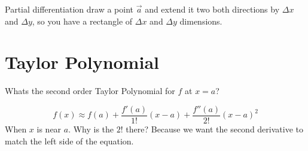 \documentclass[letter]{article}
\begin{document}
Partial differentiation draw a point $\vec{a}$ and extend it two both directions by $\Delta x$ and $\Delta y$, so you have a rectangle of $\Delta x$ and $\Delta y$ dimensions. 

\section*{Taylor Polynomial}
Whats the second order Taylor Polynomial for $f$ at $x=a$? 

\[ f(x) \approx 
f(a) + \frac{f'(a) }{1 ! } (x-a) + 
\frac{f''(a) }{2! }(x-a)^2
\] When $x $ is near $a$. Why is the $2 !$ there? Because we want the second derivative to match the left side of the equation.  
\end{document}
